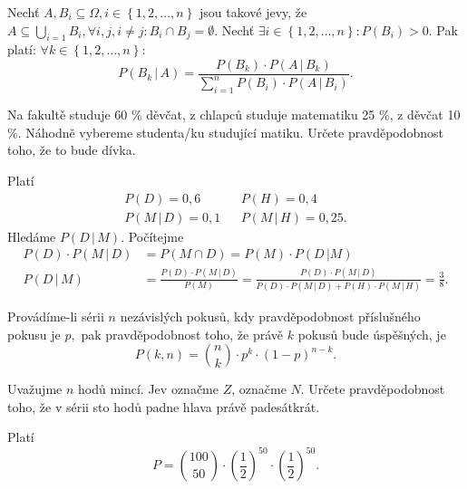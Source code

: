 \begin{veta}
    Nechť $A,B_i \subseteq \Omega, i \in \left \{ 1, 2, \dots, n \right \} $ jsou
    takové jevy, že $A\subseteq \bigcup_{i=1} B_i, \forall i,j, i\ne j: B_i\cap B_j=
    \emptyset.$ Nechť $\exists i \in \left \{ 1, 2, \dots, n \right \} : P(B_i) >0.$
    Pak platí: $\forall k\in \left \{ 1, 2, \dots, n \right \}:$
    $$P(B_k \, |\, A)=\frac{P(B_k)\cdot P(A\, |\, B_k)}{\sum_{i=1}^n P(B_i)\cdot
    P(A\, |\, B_i)}. $$
\end{veta}

\begin{priklad}
Na fakultě studuje 60 \% děvčat, z chlapců studuje matematiku 25 \%,
z děvčat 10 \%. Náhodně vybereme studenta/ku studující matiku. Určete
pravděpodobnost toho, že to bude dívka.
\end{priklad}

\begin{reseni}
Platí
\begin{align*}
P(D)=0,6 & & P(H)=0,4 \\
P(M \, | \, D)=0,1 & & P(M \, | \, H)=0,25.
\end{align*}
Hledáme $P(D \, | \, M).$ Počítejme
\begin{align*}
 P(D)\cdot P(M \, | \, D)&=P(M \cap D)=P(M)\cdot P(D \, | M)\\
 P(D \,|\, M) &= \frac{P(D)\cdot P(M \, | \, D)}{P(M)}=\frac{P(D)\cdot P(M \, | \, D)}{P(D)\cdot P(M\, | \, D)+P(H)\cdot P(M \, | \, H)}=\frac{3}{8}.
\end{align*}
\end{reseni}

\begin{veta}
    Provádíme-li sérii $n$ nezávislých pokusů, kdy pravděpodobnost příslušného
    pokusu je $p,$ pak pravděpodobnost toho, že právě $k$ pokusů bude úspěšných, je
    $$P(k,n)=\binom{n}{k}\cdot p^k \cdot (1-p)^{n-k}.$$
\end{veta}

\begin{priklad}
Uvažujme $n$ hodů mincí. Jev  označme $Z$,  označme $N$.
Určete pravděpodobnost toho, že v sérii sto hodů padne hlava právě padesátkrát.
\end{priklad}

\begin{reseni}
Platí
$$P=\binom{100}{50}\cdot \left ( \frac{1}{2} \right )^{50}\cdot \left ( \frac{1}{2} \right )^{50}.  $$
\end{reseni}
